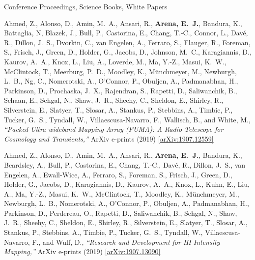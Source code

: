 \documentclass{resume} %
\begin{document}
\begin{rSection}{Conference Proceedings, Science Books, White Papers}

\begin{etaremune}

\item {Ahmed}, Z., {Alonso}, D., {Amin}, M.~A.,
         {Ansari}, R., \textbf{{Arena}, E.~J.}, {Bandura}, K.,
         {Battaglia}, N, {Blazek}, J., 
         {Bull}, P., {Castorina}, E.,
         {Chang}, T.-C., {Connor}, L., {Dav{\'e}}, R., {Dillon}, J.~S.,
         {Dvorkin}, C.,
         {van Engelen}, A., {Ferraro}, S., {Flauger}, R.,
         {Foreman}, S., {Frisch}, J., {Green}, D.,
         {Holder}, G., {Jacobs}, D., {Johnson}, M.~C.,
         {Karagiannis}, D.,
         {Kaurov}, A.~A., {Knox}, L., 
         {Liu}, A., {Loverde}, M., {Ma}, Y.-Z., {Masui}, K.~W.,
         {McClintock}, T., {Meerburg}, P.~D., {Moodley}, K.,
         {M{\"u}nchmeyer}, M., {Newburgh}, L.~B., {Ng}, C.,
         {Nomerotski}, A., {O'Connor}, P., {Obuljen}, A.,
         {Padmanabhan}, H., {Parkinson}, D., {Prochaska}, J.~X.,
         {Rajendran}, S.,
         {Rapetti}, D., {Saliwanchik}, B., {Schaan}, E., {Sehgal}, N.,
         {Shaw}, J.~R., {Sheehy}, C., {Sheldon}, E.,
         {Shirley}, R., {Silverstein}, E., {Slatyer}, T.,
         {Slosar}, A., {Stankus}, P., {Stebbins}, A.,
         {Timbie}, P., {Tucker}, G.~S., {Tyndall}, W.,
         {Villaescusa-Navarro}, F., {Wallisch}, B., and {White}, M.,
\textit{``Packed Ultra-wideband Mapping Array (PUMA): A Radio Telescope for Cosmology and Transients,''} ArXiv e-prints (2019) \href{https://arxiv.org/abs/1907.12559}{[arXiv:1907.12559]}

\item {Ahmed}, Z., {Alonso}, D., {Amin}, M.~A.,
         {Ansari}, R., \textbf{{Arena}, E.~J.}, {Bandura}, K.,
         {Beardsley}, A., {Bull}, P., {Castorina}, E.,
         {Chang}, T.-C., {Dav{\'e}}, R., {Dillon}, J.~S.,
         {van Engelen}, A., {Ewall-Wice}, A., {Ferraro}, S.,
         {Foreman}, S., {Frisch}, J., {Green}, D.,
         {Holder}, G., {Jacobs}, D., {Karagiannis}, D.,
         {Kaurov}, A.~A., {Knox}, L., {Kuhn}, E.,
         {Liu}, A., {Ma}, Y.-Z., {Masui}, K.~W.,
         {McClintock}, T., {Moodley}, K.,
         {M{\"u}nchmeyer}, M., {Newburgh}, L.~B.,
         {Nomerotski}, A., {O'Connor}, P., {Obuljen}, A.,
         {Padmanabhan}, H., {Parkinson}, D., {Perdereau}, O.,
         {Rapetti}, D., {Saliwanchik}, B., {Sehgal}, N.,
         {Shaw}, J.~R., {Sheehy}, C., {Sheldon}, E.,
         {Shirley}, R., {Silverstein}, E., {Slatyer}, T.,
         {Slosar}, A., {Stankus}, P., {Stebbins}, A.,
         {Timbie}, P., {Tucker}, G.~S., {Tyndall}, W.,
         {Villaescusa-Navarro}, F., and {Wulf}, D.,
\textit{``Research and Development for HI Intensity Mapping,''} ArXiv e-prints (2019) \href{https://arxiv.org/abs/1907.13090}{[arXiv:1907.13090]}



\end{etaremune}
\end{rSection}
\end{document}
